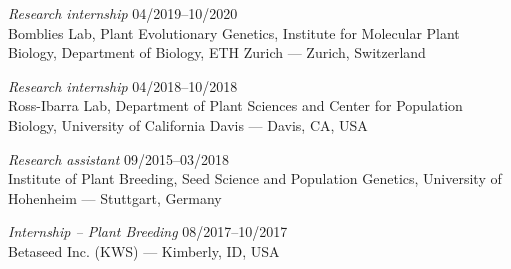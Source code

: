 \documentclass[margin,a4paper]{res}
\begin{document}
\begin{resume}
{\sl Research internship} \hfill 04/2019--10/2020 \\
Bomblies Lab, Plant Evolutionary Genetics, Institute for Molecular Plant Biology, Department of Biology, ETH Zurich --- Zurich, Switzerland


{\sl Research internship} \hfill 04/2018--10/2018 \\
Ross-Ibarra Lab, Department of Plant Sciences and Center for Population Biology, University of California Davis --- Davis, CA, USA



{\sl Research assistant} \hfill 09/2015--03/2018 \\
Institute of Plant Breeding, Seed Science and Population Genetics, University of Hohenheim --- Stuttgart, Germany



{\sl Internship -- Plant Breeding} \hfill 08/2017--10/2017 \\
Betaseed Inc. (KWS) --- Kimberly, ID, USA



\end{resume}
\end{document}
